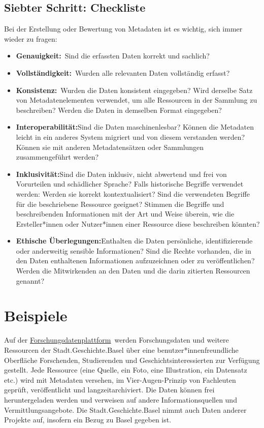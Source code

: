 \documentclass[
  letterpaper,
  DIV=11,
  numbers=noendperiod,
  landscape,
  a4paper,
  geometry:margin=1in]{scrartcl}
\begin{document}
\subsection{Siebter Schritt:
Checkliste}\label{siebter-schritt-checkliste}

Bei der Erstellung oder Bewertung von Metadaten ist es wichtig, sich
immer wieder zu fragen:

\begin{itemize}
\item
  \textbf{Genauigkeit:}~Sind die erfassten Daten korrekt und sachlich?
\item
  \textbf{Vollständigkeit:}~Wurden alle relevanten Daten vollständig
  erfasst?
\item
  \textbf{Konsistenz:}~Wurden die Daten konsistent eingegeben? Wird
  derselbe Satz von Metadatenelementen verwendet, um alle Ressourcen in
  der Sammlung zu beschreiben? Werden die Daten in demselben Format
  eingegeben?
\item
  \textbf{Interoperabilität:}Sind die Daten maschinenlesbar? Können die
  Metadaten leicht in ein anderes System migriert und von diesem
  verstanden werden? Können sie mit anderen Metadatensätzen oder
  Sammlungen zusammengeführt werden?
\item
  \textbf{Inklusivität:}Sind die Daten inklusiv, nicht abwertend und
  frei von Vorurteilen und schädlicher Sprache? Falls historische
  Begriffe verwendet werden: Werden sie korrekt kontextualisiert? Sind
  die verwendeten Begriffe für die beschriebene Ressource geeignet?
  Stimmen die Begriffe und beschreibenden Informationen mit der Art und
  Weise überein, wie die Ersteller*innen oder Nutzer*innen einer
  Ressource diese beschreiben könnten?
\item
  \textbf{Ethische Überlegungen:}Enthalten die Daten persönliche,
  identifizierende oder anderweitig sensible Informationen? Sind die
  Rechte vorhanden, die in den Daten enthaltenen Informationen
  aufzuzeichnen oder zu veröffentlichen? Werden die Mitwirkenden an den
  Daten und die darin zitierten Ressourcen genannt?
\end{itemize}

\section{Beispiele}\label{beispiele}

Auf der
\href{https://forschung.stadtgeschichtebasel.ch/}{Forschungsdatenplattform}~werden
Forschungsdaten und weitere Ressourcen der Stadt.Geschichte.Basel über
eine benutzer*innenfreundliche Oberfläche Forschenden, Studierenden und
Geschichtsinteressierten zur Verfügung gestellt. Jede Ressource (eine
Quelle, ein Foto, eine Illustration, ein Datensatz etc.) wird mit
Metadaten versehen, im Vier-Augen-Prinzip von Fachleuten geprüft,
veröffentlicht und langzeitarchiviert. Die Daten können frei
heruntergeladen werden und verweisen auf andere Informationsquellen und
Vermittlungsangebote. Die Stadt.Geschichte.Basel nimmt auch Daten
anderer Projekte auf, insofern ein Bezug zu Basel gegeben ist.
\end{document}
